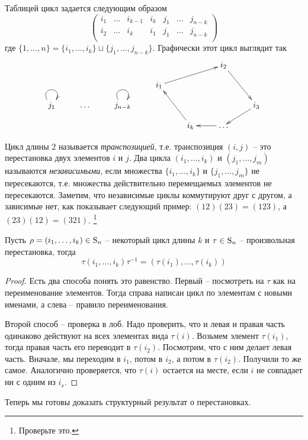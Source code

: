 Таблицей цикл задается следующим образом
\[
\begin{pmatrix}
{i_1}&{\ldots}&{i_{k-1}}&{i_k}&{j_1}&{\ldots}&{j_{n-k}}\\
{i_2}&{\ldots}&{i_k}&{i_1}&{j_{1}}&{\ldots}&{j_{n-k}}\\
\end{pmatrix}
\]
где $\{1,\ldots,n\} = \{i_1,\ldots,i_k\}\sqcup\{j_1,\ldots,j_{n-k}\}$.
Графически этот цикл выглядит так
\[
\xymatrix@R=10pt{
	{}&{}&{}&{}&{}&{i_2}\ar[rdd]&{}\\
	{}&{}&{}&{i_1}\ar[urr]&{}&{}&{}\\
	{j_1}\ar@(ul,ur)&{\ldots}&{j_{n-k}}\ar@(ul,ur)&{}&{}&{}&{i_3}\ar[dl]\\
	{}&{}&{}&{}&{i_k}\ar[uul]&{\ldots}\ar[l]&{}\\
}
\]

Цикл длины $2$ называется {\it транспозицией}, т.е. транспозиция $(i,j)$ -- это перестановка двух элементов $i$ и $j$.
Два цикла $(i_1,\ldots,i_k)$ и $(j_1,\ldots,j_m)$ называются {\it независимыми}, если множества $\{i_1,\ldots,i_k\}$ и $\{j_1,\ldots,j_m\}$ не пересекаются, т.е. множества действительно перемещаемых элементов не пересекаются.
Заметим, что независимые циклы коммутируют друг с другом, а зависимые нет, как показывает следующий пример: $(12)(23) = (123)$, а $(23)(12) = (321)$.%
\footnote{Проверьте это.}

\begin{claim}
\label{claim:CycleRename}
Пусть $\rho = (i_1,\ldots, i_k)\in\operatorname{S}_{n}$ -- некоторый цикл длины $k$ и $\tau\in\operatorname{S}_{n}$ -- произвольная перестановка, тогда 
\[
\tau(i_1,\ldots,i_k)\tau^{-1} = (\tau(i_1),\ldots,\tau(i_k))
\]
\end{claim}
\begin{proof}
Есть два способа понять это равенство.
Первый -- посмотреть на $\tau$ как на переименование элементов.
Тогда справа написан цикл по элементам с новыми именами, а слева -- правило переименования.

Второй способ -- проверка в лоб.
Надо проверить, что и левая и правая часть одинаково действуют на всех элементах вида $\tau(i)$.
Возьмем элемент $\tau(i_1)$, тогда правая часть его переводит в $\tau(i_2)$.
Посмотрим, что с ним делает левая часть.
Вначале, мы переходим в $i_1$, потом в $i_2$, а потом в $\tau(i_2)$.
Получили то же самое.
Аналогично проверяется, что $\tau(i)$ остается на месте, если $i$ не совпадает ни с одним из $i_s$.
\end{proof}

Теперь мы готовы доказать структурный результат о перестановках.

